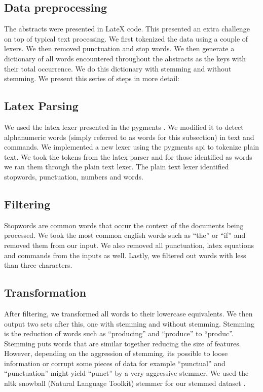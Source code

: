 \documentclass{acm_proc_article-sp}
\begin{document}
\subsection{Data preprocessing}
The abstracts were presented in LateX code. This presented an extra challenge on top of typical text processing. We first tokenized the data using a couple of lexers. We then removed punctuation and stop words. We then generate a dictionary of all words encountered throughout the abstracts as the keys with their total occurrence. We do this dictionary with stemming and without stemming. We present this series of steps in more detail: 

\subsection{Latex Parsing} 
We used the latex lexer presented in the pygments \cite{pygments}. We modified it to detect alphanumeric words (simply referred to as words for this subsection) in text and commands. We implemented a new lexer using the pygments api to tokenize plain text. We took the tokens from the latex parser and for those identified as words we ran them through the plain text lexer. The plain text lexer identified stopwords, punctuation, numbers and words. 

\subsection{Filtering}
Stopwords are common words that occur the context of the documents being processed. We took the most common english words such as ``the'' or ``if'' and removed them from our input. We also removed all punctuation, latex equations and commands from the inputs as well. Lastly, we filtered out words with less than three characters. 

\subsection{Transformation}
After filtering, we transformed all words to their lowercase equivalents. We then output two sets after this, one with stemming and without stemming. Stemming is the reduction of words such as ``producing''  and ``produce'' to ``produc''. Stemming puts words that are similar together reducing the size of features. However, depending on the aggression of stemming, its possible to loose information or corrupt some pieces of data for example ``punctual'' and ``punctuation'' might yield ``punct'' by a very aggressive stemmer. We used the nltk snowball (Natural Language Toolkit) stemmer for our stemmed dataset \cite{nltk}.
\end{document}
